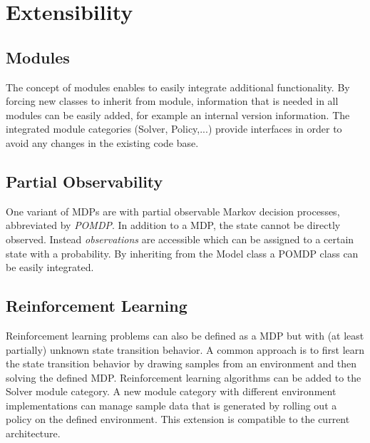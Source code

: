 \chapter{Extensibility}

\section{Modules}

The concept of modules enables to easily integrate additional functionality. By forcing new classes to inherit from module, information that is needed in all modules can be easily added, for example an internal version information. The integrated module categories (Solver, Policy,...) provide interfaces in order to avoid any changes in the existing code base. 

\section{Partial Observability}

One variant of MDPs are with partial observable Markov decision processes, abbreviated by \emph{POMDP}. In addition to a MDP, the state cannot be directly observed. Instead \emph{observations} are accessible which can be assigned to a certain state with a probability. By inheriting from the Model class a POMDP class can be easily integrated. 

\section{Reinforcement Learning}

Reinforcement learning problems can also be defined as a MDP but with (at least partially) unknown state transition behavior. A common approach is to first learn the state transition behavior by drawing samples from an environment and then solving the defined MDP. Reinforcement learning algorithms can be added to the Solver module category. A new module category with different environment implementations can manage sample data that is generated by rolling out a policy on the defined environment. This extension is compatible to the current architecture.  